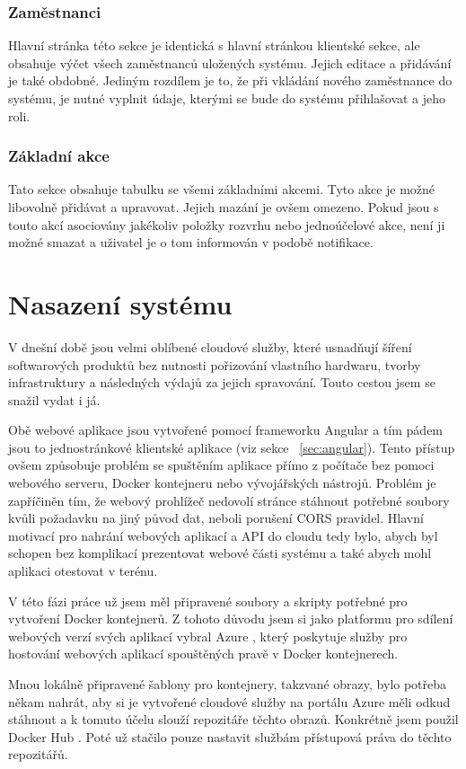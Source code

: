 \documentclass[
  biblatex,
  glossaries,
  index
]{kidiplom}
\begin{document}
\subsubsection{Zaměstnanci}
Hlavní stránka této sekce je identická s hlavní stránkou klientské sekce, ale obsahuje výčet všech zaměstnanců uložených systému. Jejich editace a přidávání je také obdobné. Jediným rozdílem je to, že při vkládání nového zaměstnance do systému, je nutné vyplnit údaje, kterými se bude do systému přihlašovat a jeho roli.

\subsubsection{Základní akce}
Tato sekce obsahuje tabulku se všemi základními akcemi. Tyto akce je možné libovolně přidávat a upravovat. Jejich mazání je ovšem omezeno. Pokud jsou s touto akcí asociovány jakékoliv položky rozvrhu nebo jednoúčelové akce, není ji možné smazat a uživatel je o tom informován v podobě notifikace.
\newpage


\section{Nasazení systému}
V dnešní době jsou velmi oblíbené cloudové služby, které usnadňují šíření softwarových produktů bez nutnosti pořizování vlastního hardwaru, tvorby infrastruktury a následných výdajů za jejich spravování. Touto cestou jsem se snažil vydat i já.

Obě webové aplikace jsou vytvořené pomocí frameworku Angular a tím pádem jsou to jednostránkové klientské aplikace (viz sekce ~\ref{sec:angular}). Tento přístup ovšem způsobuje problém se spuštěním aplikace přímo z počítače bez pomoci webového serveru, Docker kontejneru nebo vývojářských nástrojů. Problém je zapříčiněn tím, že webový prohlížeč nedovolí stránce stáhnout potřebné soubory kvůli požadavku na jiný původ dat, neboli porušení CORS \cite{16} pravidel. Hlavní motivací pro nahrání webových aplikací a API do cloudu tedy bylo, abych byl schopen bez komplikací prezentovat webové části systému a také abych mohl aplikaci otestovat v terénu.

V této fázi práce už jsem měl připravené soubory a skripty potřebné pro vytvoření Docker kontejnerů. Z tohoto důvodu jsem si jako platformu pro sdílení webových verzí svých aplikací vybral Azure \cite{17}, který poskytuje služby pro hostování webových aplikací spouštěných pravě v Docker kontejnerech.

Mnou lokálně připravené šablony pro kontejnery, takzvané obrazy, bylo potřeba někam nahrát, aby si je vytvořené cloudové služby na portálu Azure měli odkud stáhnout a k tomuto účelu slouží repozitáře těchto obrazů. Konkrétně jsem použil Docker Hub \cite{18}. Poté už stačilo pouze nastavit službám přístupová práva do těchto repozitářů.
\end{document}
